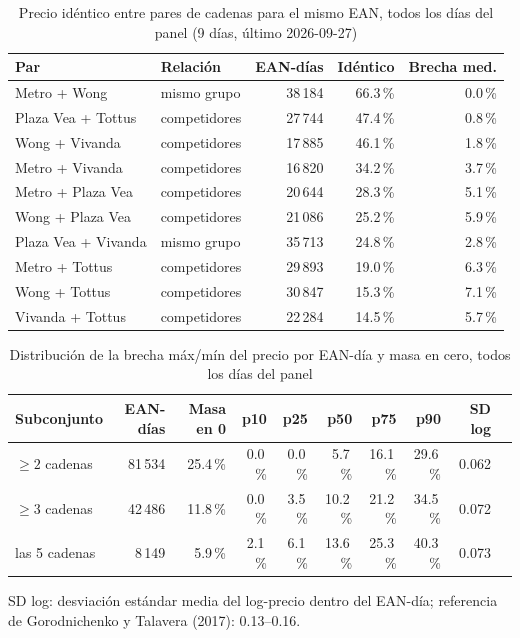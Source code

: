 
\begin{table}[htbp]
\caption{Precio id\'entico entre pares de cadenas para el mismo EAN, todos los d\'ias del panel (9 d\'ias, \'ultimo 2026-09-27)}
\label{tab:identidad}
\centering\scriptsize\setlength{\tabcolsep}{3pt}
\begin{tabular}{@{}llrrr@{}}
\toprule
Par & Relaci\'on & EAN-d\'ias & Id\'entico & Brecha med. \\
\midrule
Metro + Wong & mismo grupo & 38\,184 & 66.3\,\% & 0.0\,\% \\
Plaza Vea + Tottus & competidores & 27\,744 & 47.4\,\% & 0.8\,\% \\
Wong + Vivanda & competidores & 17\,885 & 46.1\,\% & 1.8\,\% \\
Metro + Vivanda & competidores & 16\,820 & 34.2\,\% & 3.7\,\% \\
Metro + Plaza Vea & competidores & 20\,644 & 28.3\,\% & 5.1\,\% \\
Wong + Plaza Vea & competidores & 21\,086 & 25.2\,\% & 5.9\,\% \\
Plaza Vea + Vivanda & mismo grupo & 35\,713 & 24.8\,\% & 2.8\,\% \\
Metro + Tottus & competidores & 29\,893 & 19.0\,\% & 6.3\,\% \\
Wong + Tottus & competidores & 30\,847 & 15.3\,\% & 7.1\,\% \\
Vivanda + Tottus & competidores & 22\,284 & 14.5\,\% & 5.7\,\% \\
\bottomrule\end{tabular}\end{table}

\begin{table}[t]
\caption{Distribuci\'on de la brecha m\'ax/m\'in del precio por EAN-d\'ia y masa en cero, todos los d\'ias del panel}
\label{tab:brecha}
\centering\scriptsize\setlength{\tabcolsep}{4pt}
\begin{tabular}{@{}lrrrrrrrrr@{}}
\toprule
Subconjunto & EAN-d\'ias & Masa en 0 & p10 & p25 & p50 & p75 & p90 & SD log \\
\midrule
$\geq 2$ cadenas & 81\,534 & 25.4\,\% & 0.0\,\% & 0.0\,\% & 5.7\,\% & 16.1\,\% & 29.6\,\% & 0.062 \\
$\geq 3$ cadenas & 42\,486 & 11.8\,\% & 0.0\,\% & 3.5\,\% & 10.2\,\% & 21.2\,\% & 34.5\,\% & 0.072 \\
las 5 cadenas & 8\,149 & 5.9\,\% & 2.1\,\% & 6.1\,\% & 13.6\,\% & 25.3\,\% & 40.3\,\% & 0.073 \\
\bottomrule\end{tabular}
\par\smallskip\raggedright\scriptsize SD log: desviaci\'on est\'andar media del log-precio dentro del EAN-d\'ia; referencia de Gorodnichenko y Talavera (2017): 0.13--0.16.
\end{table}

